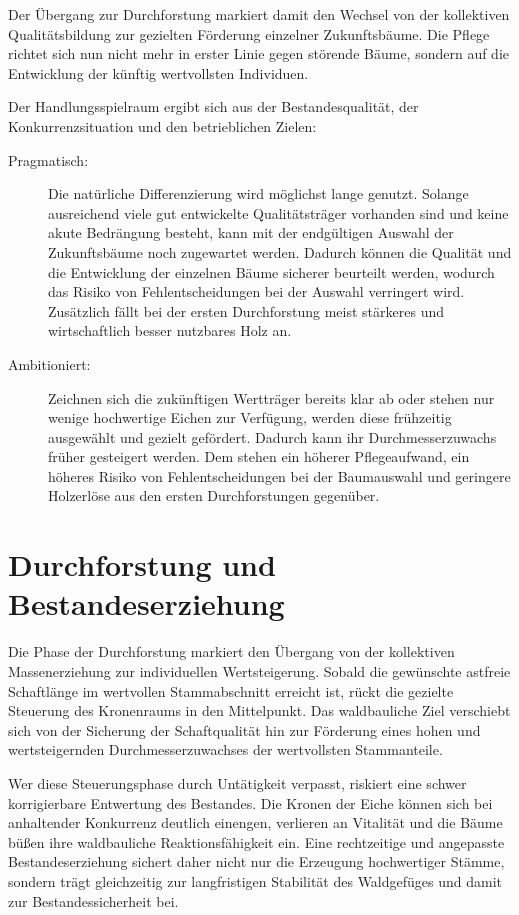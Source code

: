 \documentclass[twocolumn, bibliography=totoc, abstract=true]{scrartcl}
\begin{document}
Der Übergang zur Durchforstung markiert damit den Wechsel von der kollektiven Qualitätsbildung zur gezielten Förderung einzelner Zukunftsbäume. Die Pflege richtet sich nun nicht mehr in erster Linie gegen störende Bäume, sondern auf die Entwicklung der künftig wertvollsten Individuen.

Der Handlungsspielraum ergibt sich aus der Bestandesqualität, der Konkurrenzsituation und den betrieblichen Zielen:

\begin{description}
\item[Pragmatisch:] Die natürliche Differenzierung wird möglichst lange genutzt. Solange ausreichend viele gut entwickelte Qualitätsträger vorhanden sind und keine akute Bedrängung besteht, kann mit der endgültigen Auswahl der Zukunftsbäume noch zugewartet werden. Dadurch können die Qualität und die Entwicklung der einzelnen Bäume sicherer beurteilt werden, wodurch das Risiko von Fehlentscheidungen bei der Auswahl verringert wird. Zusätzlich fällt bei der ersten Durchforstung meist stärkeres und wirtschaftlich besser nutzbares Holz an.
\item[Ambitioniert:] Zeichnen sich die zukünftigen Wertträger bereits klar ab oder stehen nur wenige hochwertige Eichen zur Verfügung, werden diese frühzeitig ausgewählt und gezielt gefördert. Dadurch kann ihr Durchmesserzuwachs früher gesteigert werden. Dem stehen ein höherer Pflegeaufwand, ein höheres Risiko von Fehlentscheidungen bei der Baumauswahl und geringere Holzerlöse aus den ersten Durchforstungen gegenüber.
\end{description}


\section{Durchforstung und Bestandeserziehung}

Die Phase der Durchforstung markiert den Übergang von der kollektiven Massenerziehung zur individuellen Wertsteigerung. Sobald die gewünschte astfreie Schaftlänge im wertvollen Stammabschnitt erreicht ist, rückt die gezielte Steuerung des Kronenraums in den Mittelpunkt. Das waldbauliche Ziel verschiebt sich von der Sicherung der Schaftqualität hin zur Förderung eines hohen und wertsteigernden Durchmesserzuwachses der wertvollsten Stammanteile.

Wer diese Steuerungsphase durch Untätigkeit verpasst, riskiert eine schwer korrigierbare Entwertung des Bestandes. Die Kronen der Eiche können sich bei anhaltender Konkurrenz deutlich einengen, verlieren an Vitalität und die Bäume büßen ihre waldbauliche Reaktionsfähigkeit ein. Eine rechtzeitige und angepasste Bestandeserziehung sichert daher nicht nur die Erzeugung hochwertiger Stämme, sondern trägt gleichzeitig zur langfristigen Stabilität des Waldgefüges und damit zur Bestandessicherheit bei.
\end{document}
